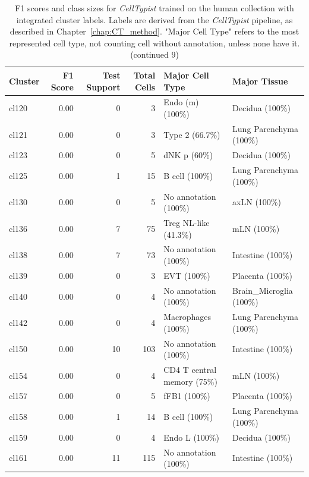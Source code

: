 \begin{table}[ht!]
\scriptsize
\caption[F1 scores and class sizes for \textit{CellTypist} trained on the human collection with integrated cluster labels (continued 9)]{F1 scores and class sizes for \textit{CellTypist} trained on the human collection with integrated cluster labels. Labels are derived from the \textit{CellTypist} pipeline, as described in Chapter~\ref{chap:CT_method}. "Major Cell Type" refers to the most represented cell type, not counting cell without annotation, unless none have it. (continued 9)}
\centering
\label{table:tab_HAmodelclust9}
\begin{tabular}{lrrrll}
  \toprule
Cluster & F1 Score & Test Support & Total Cells & Major Cell Type & Major Tissue \\ 
  \midrule  
  cl120 & 0.00 &   0 &   3 & Endo (m) (100\%) & Decidua (100\%) \\ 
  cl121 & 0.00 &   0 &   3 & Type 2 (66.7\%) & Lung Parenchyma (100\%) \\ 
  cl123 & 0.00 &   0 &   5 & dNK p (60\%) & Decidua (100\%) \\ 
  cl125 & 0.00 &   1 &  15 & B cell (100\%) & Lung Parenchyma (100\%) \\ 
  cl130 & 0.00 &   0 &   5 & No annotation (100\%) & axLN (100\%) \\ 
  cl136 & 0.00 &   7 &  75 & Treg NL-like (41.3\%) & mLN (100\%) \\ 
  cl138 & 0.00 &   7 &  73 & No annotation (100\%) & Intestine (100\%) \\ 
  cl139 & 0.00 &   0 &   3 & EVT (100\%) & Placenta (100\%) \\ 
  cl140 & 0.00 &   0 &   4 & No annotation (100\%) & Brain\_Microglia (100\%) \\ 
  cl142 & 0.00 &   0 &   4 & Macrophages (100\%) & Lung Parenchyma (100\%) \\ 
  cl150 & 0.00 &  10 & 103 & No annotation (100\%) & Intestine (100\%) \\ 
  cl154 & 0.00 &   0 &   4 & CD4 T central memory (75\%) & mLN (100\%) \\ 
  cl157 & 0.00 &   0 &   5 & fFB1 (100\%) & Placenta (100\%) \\ 
  cl158 & 0.00 &   1 &  14 & B cell (100\%) & Lung Parenchyma (100\%) \\ 
  cl159 & 0.00 &   0 &   4 & Endo L (100\%) & Decidua (100\%) \\ 
  cl161 & 0.00 &  11 & 115 & No annotation (100\%) & Intestine (100\%) \\ 

\end{tabular}
\end{table}
